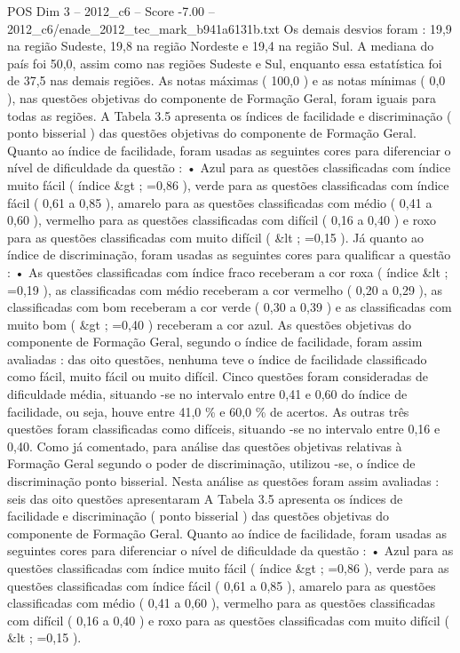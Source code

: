 \begin{textsample}{POS Dim 3 – 2012\_c6 – Score -7.00 – 2012\_c6/enade\_2012\_tec\_mark\_b941a6131b.txt}
Os demais desvios foram : 19,9 na região Sudeste, 19,8 na região Nordeste e 19,4 na região Sul.
A mediana do país foi 50,0, assim como nas regiões Sudeste e Sul, enquanto essa estatística foi de 37,5 nas demais regiões.
As notas máximas ( 100,0 ) e as notas mínimas ( 0,0 ), nas questões objetivas do componente de Formação Geral, foram iguais para todas as regiões.
A Tabela 3.5 apresenta os índices de facilidade e discriminação ( ponto bisserial ) das questões objetivas do componente de Formação Geral.
Quanto ao índice de facilidade, foram usadas as seguintes cores para diferenciar o nível de dificuldade da questão : • Azul para as questões classificadas com índice muito fácil ( índice \&gt ; =0,86 ), verde para as questões classificadas com índice fácil ( 0,61 a 0,85 ), amarelo para as questões classificadas com médio ( 0,41 a 0,60 ), vermelho para as questões classificadas com difícil ( 0,16 a 0,40 ) e roxo para as questões classificadas com muito difícil ( \&lt ; =0,15 ).
Já quanto ao índice de discriminação, foram usadas as seguintes cores para qualificar a questão : • As questões classificadas com índice fraco receberam a cor roxa ( índice \&lt ; =0,19 ), as classificadas com médio receberam a cor vermelho ( 0,20 a 0,29 ), as classificadas com bom receberam a cor verde ( 0,30 a 0,39 ) e as classificadas com muito bom ( \&gt ; =0,40 ) receberam a cor azul.
As questões objetivas do componente de Formação Geral, segundo o índice de facilidade, foram assim avaliadas : das oito questões, nenhuma teve o índice de facilidade classificado como fácil, muito fácil ou muito difícil.
Cinco questões foram consideradas de dificuldade média, situando -se no intervalo entre 0,41 e 0,60 do índice de facilidade, ou seja, houve entre 41,0 \% e 60,0 \% de acertos.
As outras três questões foram classificadas como difíceis, situando -se no intervalo entre 0,16 e 0,40.
Como já comentado, para análise das questões objetivas relativas à Formação Geral segundo o poder de discriminação, utilizou -se, o índice de discriminação ponto bisserial.
Nesta análise as questões foram assim avaliadas : seis das oito questões apresentaram A Tabela 3.5 apresenta os índices de facilidade e discriminação ( ponto bisserial ) das questões objetivas do componente de Formação Geral.
Quanto ao índice de facilidade, foram usadas as seguintes cores para diferenciar o nível de dificuldade da questão : • Azul para as questões classificadas com índice muito fácil ( índice \&gt ; =0,86 ), verde para as questões classificadas com índice fácil ( 0,61 a 0,85 ), amarelo para as questões classificadas com médio ( 0,41 a 0,60 ), vermelho para as questões classificadas com difícil ( 0,16 a 0,40 ) e roxo para as questões classificadas com muito difícil ( \&lt ; =0,15 ).

\end{textsample}
